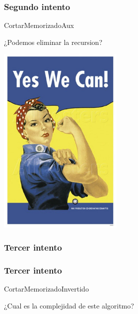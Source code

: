 \documentclass{beamer}
\begin{document}
\begin{frame}
    \frametitle{Segundo intento}
    \begin{algorithm}[H]
        \caption{CortarMemorizadoAux}
        \begin{algorithmic}[1]
        \EndIf
        \Else
        \EndFor
        \EndIf
        \EndProcedure
        \end{algorithmic}
    \end{algorithm}
    ¿Podemos eliminar la recursion?
\end{frame}

\begin{frame}
    \begin{center}
    \includegraphics[width=6cm]{wecan.jpg}
    \end{center}
\end{frame}

\begin{frame}
\frametitle{Tercer intento}
\end{frame}

\begin{frame}
\frametitle{Tercer intento}

\begin{algorithm}[H]
    \caption{CortarMemorizadoInvertido}
    \begin{algorithmic}[1]
        \EndFor
    \EndFor
    \EndProcedure
    \end{algorithmic}
¿Cual es la complejidad de este algoritmo?
\end{algorithm}
\end{frame}
\end{document}
